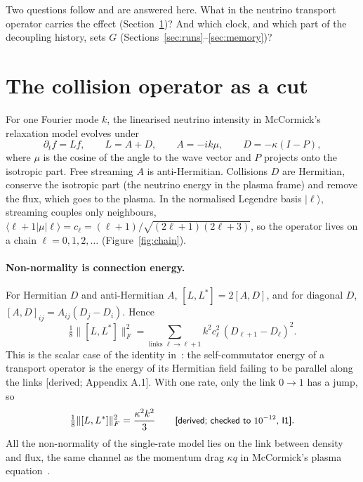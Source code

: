 \documentclass[11pt]{article}
\newcommand{\grade}[1]{\textsf{\small[#1]}}
\begin{document}
Two questions follow and are answered here. What in the neutrino transport operator carries the effect (Section~\ref{sec:cut})? And which clock, and which part of the decoupling history, sets $G$ (Sections~\ref{sec:runs}--\ref{sec:memory})?

\section{The collision operator as a cut}\label{sec:cut}

For one Fourier mode $k$, the linearised neutrino intensity in McCormick's relaxation model evolves under
\begin{equation}
\partial_t f=L f,\qquad L=A+D,\qquad A=-ik\mu,\qquad D=-\kappa(I-P),
\end{equation}
where $\mu$ is the cosine of the angle to the wave vector and $P$ projects onto the isotropic part. Free streaming $A$ is anti-Hermitian. Collisions $D$ are Hermitian, conserve the isotropic part (the neutrino energy in the plasma frame) and remove the flux, which goes to the plasma. In the normalised Legendre basis $|\ell\rangle$, streaming couples only neighbours, $\langle\ell+1|\mu|\ell\rangle=c_\ell=(\ell+1)/\sqrt{(2\ell+1)(2\ell+3)}$, so the operator lives on a chain $\ell=0,1,2,\dots$ (Figure~\ref{fig:chain}).

\paragraph{Non-normality is connection energy.} For Hermitian $D$ and anti-Hermitian $A$, $[L,L^\ast]=2[A,D]$, and for diagonal $D$, $[A,D]_{ij}=A_{ij}(D_j-D_i)$. Hence
\begin{equation}
\tfrac18\lVert[L,L^\ast]\rVert_F^2=\sum_{\text{links }\ell\to\ell+1}k^2c_\ell^2\,(D_{\ell+1}-D_\ell)^2 .
\end{equation}
This is the scalar case of the identity in~\cite{CE}: the self-commutator energy of a transport operator is the energy of its Hermitian field failing to be parallel along the links \grade{derived; Appendix A.1}. With one rate, only the link $0\to1$ has a jump, so
\begin{equation}
\tfrac18\lVert[L,L^\ast]\rVert_F^2=\frac{\kappa^2k^2}{3}\qquad\text{\grade{derived; checked to $10^{-12}$, I1}}.
\end{equation}
All the non-normality of the single-rate model lies on the link between density and flux, the same channel as the momentum drag $\kappa q$ in McCormick's plasma equation~\cite[Eq.~(6)]{McC}.
\end{document}
